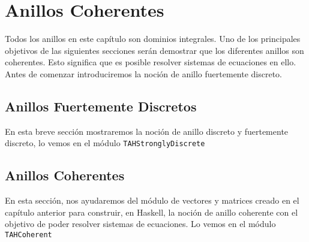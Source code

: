 \chapter{Anillos Coherentes}\label{sec:coherentHas}
Todos los anillos en este capítulo son dominios integrales. Uno de los principales objetivos de las siguientes secciones serán demostrar que los diferentes anillos son coherentes. Esto significa que es posible resolver sistemas de ecuaciones en ello. Antes de comenzar introduciremos la noción de anillo fuertemente discreto.
\section{Anillos Fuertemente Discretos}
En esta breve sección mostraremos la noción de anillo discreto y fuertemente discreto, lo vemos en el módulo \texttt{TAHStronglyDiscrete} 

\section{Anillos Coherentes}
En esta sección, nos ayudaremos del módulo de vectores y matrices creado en el capítulo anterior para construir, en Haskell, la noción de anillo coherente con el objetivo de poder resolver sistemas de ecuaciones. Lo vemos en el módulo \texttt{TAHCoherent} 
